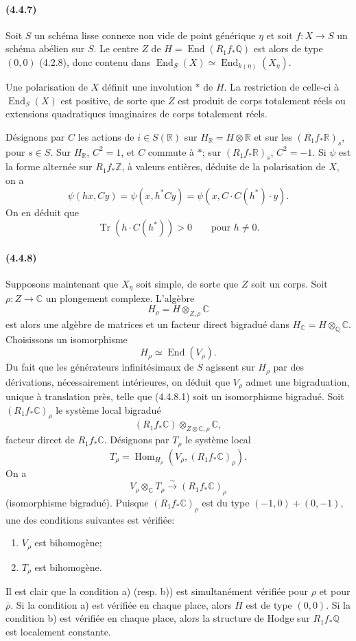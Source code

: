 \documentclass[10pt]{article}
\newcommand{\C}{\mathbb C}
\newcommand{\Q}{\mathbb Q}
\newcommand{\Z}{\mathbb Z}
\newcommand{\Hom}{\operatorname{Hom}}
\newcommand{\iso}{\xrightarrow{\sim}}
\newcommand{\R}{\mathbb R}
\providecommand{\End}{\operatorname{End}}
\newcommand{\Tr}{\operatorname{Tr}}
\begin{document}
\paragraph{(4.4.7)} Soit $S$ un schéma lisse connexe non vide de point générique $\eta$ et soit $f:X\to S$ un schéma abélien sur $S$. Le centre $Z$ de $H=\End(R_1f_*\Q)$ est alors de type $(0,0)$ (4.2.8), donc contenu dans $\End_S(X)\simeq \End_{k(\eta)}(X_\eta)$.

Une polarisation de $X$ définit une involution $*$ de $H$. La restriction de celle-ci à $\End_S(X)$ est positive, de sorte que $Z$ est produit de corps totalement réels ou extensions quadratiques imaginaires de corps totalement réels.

Désignons par $C$ les actions de $i\in S(\R)$ sur $H_\R=H\otimes\R$ et sur les $(R_1f_*\R)_s$, pour $s\in S$. Sur $H_\R$, $C^2=1$, et $C$ commute à $*$; sur $(R_1f_*\R)_s$, $C^2=-1$. Si $\psi$ est la forme alternée sur $R_1f_*\Z$, à valeurs entières, déduite de la polarisation de $X$, on a
\[
\psi(hx,Cy)=\psi(x,h^*Cy)=\psi(x,C\cdot C(h^*)\cdot y).
\]
On en déduit que
\[
\tag{4.4.7.1}
\Tr(h\cdot C(h^*))>0\qquad\text{pour }h\ne0.
\]

\paragraph{(4.4.8)} Supposons maintenant que $X_\eta$ soit simple, de sorte que $Z$ soit un corps. Soit $\rho:Z\to\C$ un plongement complexe. L'algèbre
\[
H_\rho=H\otimes_{Z,\rho}\C
\]
est alors une algèbre de matrices et un facteur direct bigradué dans $H_\C=H\otimes_\Q\C$. Choisissons un isomorphisme
\[
\tag{4.4.8.1}
H_\rho\simeq\End(V_\rho).
\]
Du fait que les générateurs infinitésimaux de $S$ agissent sur $H_\rho$ par des dérivations, nécessairement intérieures, on déduit que $V_\rho$ admet une bigraduation, unique à translation près, telle que (4.4.8.1) soit un isomorphisme bigradué. Soit $(R_1f_*\C)_\rho$ le système local bigradué
\[
(R_1f_*\C)\otimes_{Z\otimes\C,\rho}\C,
\]
facteur direct de $R_1f_*\C$. Désignons par $T_\rho$ le système local
\[
T_\rho=\Hom_{H_\rho}(V_\rho,(R_1f_*\C)_\rho).
\]
On a
\[
\tag{4.4.8.2}
V_\rho\otimes_\C T_\rho\iso (R_1f_*\C)_\rho
\]
(isomorphisme bigradué). Puisque $(R_1f_*\C)_\rho$ est du type $(-1,0)+(0,-1)$, une des conditions suivantes est vérifiée:
\begin{enumerate}[label=\alph*)]
\item $V_\rho$ est bihomogène;
\item $T_\rho$ est bihomogène.
\end{enumerate}
Il est clair que la condition a) (resp. b)) est simultanément vérifiée pour $\rho$ et pour $\bar\rho$. Si la condition a) est vérifiée en chaque place, alors $H$ est de type $(0,0)$. Si la condition b) est vérifiée en chaque place, alors la structure de Hodge sur $R_1f_*\Q$ est localement constante.
\end{document}
